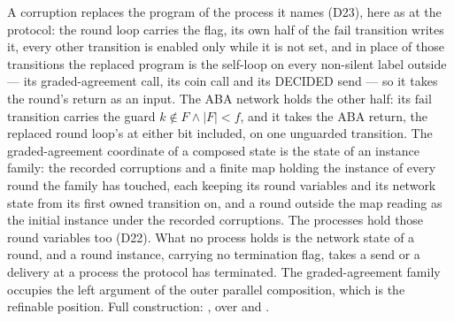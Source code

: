 \begin{definition}
  A corruption replaces the program of the process it names (D23), here as at the protocol: the round loop carries the flag, its own half of the $\mathrm{fail}$ transition writes it, every other transition is enabled only while it is not set, and in place of those transitions the replaced program is the self-loop  on every non-silent label outside  --- its graded-agreement call, its coin call and its DECIDED send --- so it takes the round's return as an input.
  The ABA network holds the other half: its $\mathrm{fail}$ transition carries the guard $k \notin F \wedge |F| < f$, and it takes the ABA return, the replaced round loop's at either bit included, on one unguarded transition.
  The graded-agreement coordinate of a composed state is the state of an instance family: the recorded corruptions and a finite map holding the instance of every round the family has touched, each keeping its round variables and its network state from its first owned transition on, and a round outside the map reading as the initial instance under the recorded corruptions.
  The processes hold those round variables too (D22).
  What no process holds is the network state of a round, and a round instance, carrying no termination flag, takes a send or a delivery at a process the protocol has terminated.
  The graded-agreement family occupies the left argument of the outer parallel composition, which is the refinable position.
  Full construction: , over  and .
\end{definition}
